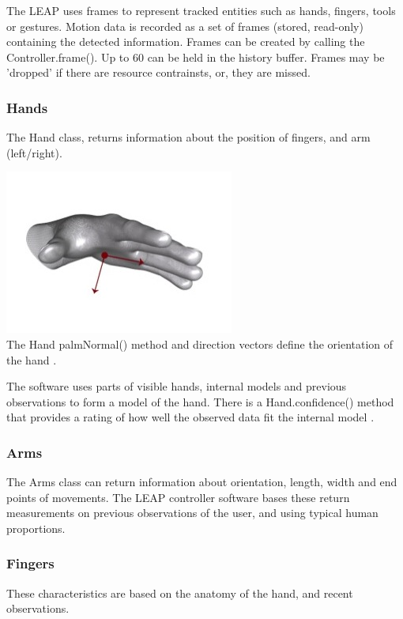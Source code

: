 \documentclass[a4paper, 10pt]{article}
\begin{document}
The LEAP uses frames to represent tracked entities such as hands, fingers, tools or gestures. Motion data is recorded as a set of frames (stored, read-only) containing the detected information. Frames can be created by calling the Controller.frame(). Up to 60 can be held in the history buffer. Frames may be 'dropped' if there are resource contrainsts, or, they are missed.

\subsubsection{Hands}
The Hand class, returns information about the position of fingers, and arm (left/right).

\begin{center}
\includegraphics[scale=0.4]{palm}\\
The Hand palmNormal() method and direction vectors define the orientation of the hand \cite{leap}.
\end{center}

The software uses parts of visible hands, internal models and previous observations to form a model of the hand. There is a Hand.confidence() method that provides a rating of how well the observed data fit the internal model \cite{leap}.

\subsubsection{Arms}
The Arms class can return information about orientation, length, width and end points of movements. The LEAP controller software bases these return measurements on previous observations of the user, and using typical human proportions.

\subsubsection{Fingers}
These characteristics are based on the anatomy of the hand, and recent observations. 
\end{document}

